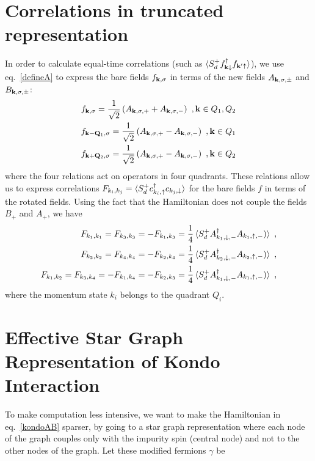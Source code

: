 \documentclass[%
reprint,
superscriptaddress,
groupedaddress,
superscriptaddress,
onecolumn,
10pt
]{revtex4-2}
\begin{document}
\section{Correlations in truncated representation}
In order to calculate equal-time correlations (such as \(\braket{S_d^+ f^\dagger_{{\bf k}\downarrow}f_{{\bf k}^\prime \uparrow}} \)), we use eq.~\ref{defineA} to express the bare fields \(f_{{\bf k},\sigma}\) in terms of the new fields \(A_{{\bf k},\sigma,\pm}\) and \(B_{{\bf k},\sigma,\pm}\):
\begin{equation}\begin{aligned}
	f_{{\bf k},\sigma} = \frac{1}{\sqrt{2}}\left(A_{{\bf k},\sigma, +} + A_{{\bf k},\sigma,-}\right)~,{\bf k} \in {Q}_1, Q_2\\
	f_{{\bf k} - {\bf Q}_1,\sigma} = \frac{1}{\sqrt{2}}\left(A_{{\bf k},\sigma, +} - A_{{\bf k},\sigma,-}\right)~,{\bf k} \in {Q}_1\\
	f_{{\bf k} + {\bf Q}_2,\sigma} = \frac{1}{\sqrt{2}}\left(A_{{\bf k},\sigma, +} - A_{{\bf k},\sigma,-}\right)~,{\bf k} \in {Q}_2\\
\end{aligned}\end{equation}
where the four relations act on operators in four quadrants. These relations allow us to express correlations \(F_{k_i, k_j} = \braket{S_d^+ c^\dagger_{k_i, \uparrow}c_{k_j, \downarrow}}\) for the bare fields \(f\) in terms of the rotated fields. Using the fact that the Hamiltonian does not couple the fields \(B_{+}\) and \(A_{+}\), we have
\begin{equation}\begin{aligned}
	F_{k_1, k_1} = F_{k_3, k_3} = -F_{k_1, k_3} = \frac{1}{4}\braket{S_d^+ A^\dagger_{k_1,\downarrow,-}A_{k_1,\uparrow,-})}~,\\
	F_{k_2, k_2} = F_{k_4, k_4} = -F_{k_2, k_4} = \frac{1}{4}\braket{S_d^+ A^\dagger_{k_2,\downarrow,-}A_{k_2,\uparrow,-})}~,\\
	F_{k_1, k_2} = F_{k_3, k_4} = -F_{k_1, k_4} = -F_{k_2, k_3} = \frac{1}{4}\braket{S_d^+ A^\dagger_{k_1,\downarrow,-}A_{k_1,\uparrow,-})}~,
\end{aligned}\end{equation}
where the momentum state \(k_i\) belongs to the quadrant \(Q_i\).

\section{Effective Star Graph Representation of Kondo Interaction}
To make computation less intensive, we want to make the Hamiltonian in eq.~\ref{kondoAB} sparser, by going to a star graph representation where each node of the graph couples only with the impurity spin (central node) and not to the other nodes of the graph. Let these modified fermions \(\gamma\) be \(\)
\end{document}
